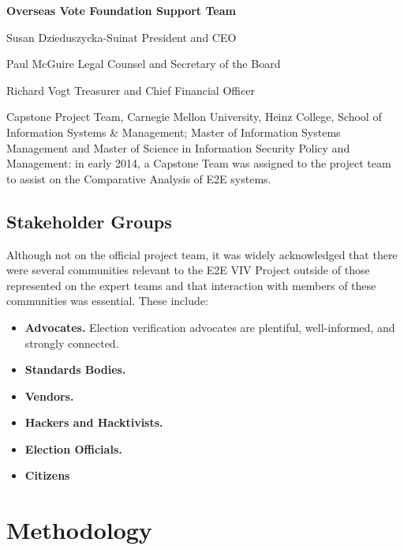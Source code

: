 \textbf{Overseas Vote Foundation Support Team}

Susan Dzieduszycka-Suinat
President and CEO
 
Paul McGuire
Legal Counsel and Secretary of the Board
 
Richard Vogt
Treasurer and Chief Financial Officer

Capstone Project Team, Carnegie Mellon University, Heinz College,
School of Information Systems \& Management; Master of Information
Systems Management and Master of Science in Information Security
Policy and Management: in early 2014, a Capstone Team was assigned to
the project team to assist on the Comparative Analysis of E2E systems.

\subsection{Stakeholder Groups}
\label{sec:stakeholder-groups}

Although not on the official project team, it was widely acknowledged
that there were several communities relevant to the E2E VIV Project
outside of those represented on the expert teams and that interaction
with members of these communities was essential. These include: 
\begin{itemize}
\item \textbf{Advocates.} Election verification advocates are
  plentiful, well-informed, and strongly connected.
\item \textbf{Standards Bodies.}
\item \textbf{Vendors.}
\item \textbf{Hackers and Hacktivists.}
\item \textbf{Election Officials.}
\item \textbf{Citizens}
\end{itemize}


\section{Methodology}


